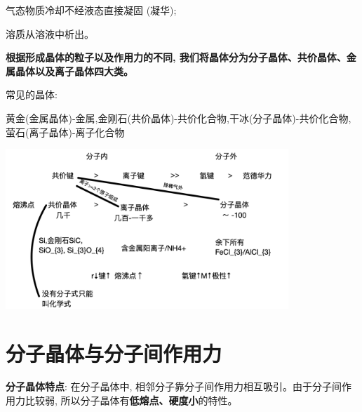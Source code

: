\documentclass[10pt,cn]{elegantbook}
\begin{document}
 气态物质冷却不经液态直接凝固 (凝华);

 溶质从溶液中析出。

\textbf{根据形成晶体的粒子以及作用力的不同, 我们将晶体分为分子晶体、共价晶体、金属晶体以及离子晶体四大类。}

\begin{center}
\end{center}

常见的晶体:

黄金(金属晶体)-金属,金刚石(共价晶体)-共价化合物,干冰(分子晶体)-共价化合物,萤石(离子晶体)-离子化合物

\begin{center}
	\includegraphics[max width=0.8\textwidth]{image/c109-2.jpg}
\end{center}

\section{分子晶体与分子间作用力}

\textbf{分子晶体特点}: 在分子晶体中, 相邻分子靠分子间作用力相互吸引。由于分子间作用力比较弱, 所以分子晶体有\textbf{低熔点、硬度小}的特性。

\begin{center}
\end{center}
\end{document}
